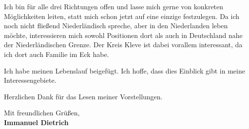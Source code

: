 \documentclass[11pt]{report}
\begin{document}
\begin{titlepage}
\vspace{0.3em}
 
Ich bin für alle drei Richtungen offen und lasse mich gerne von konkreten Möglichkeiten leiten, statt mich schon jetzt auf eine einzige festzulegen. Da ich noch nicht fließend Niederländisch spreche, aber in den Niederlanden leben möchte, 
interessieren mich sowohl Positionen dort als auch in Deutschland nahe der Niederländischen Grenze. Der Kreis Kleve ist dabei vorallem interessant, da ich dort auch Familie im Eck habe. 
 
\vspace{0.7em}
 
Ich habe meinen Lebenslauf beigefügt. Ich hoffe, dass dies Einblick gibt in meine Interessengebiete.
 

\vspace{0.7em}

Herzlichen Dank für das Lesen meiner Vorstellungen.

\vspace{0.7em}

\raggedright Mit freundlichen Grüßen,\\
\textbf{Immanuel Dietrich}

\end{titlepage}
\end{document}
